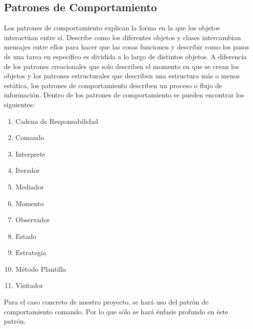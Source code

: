 \subsection{Patrones de Comportamiento}
Los patrones de comportamiento explican la forma en la que los objetos interactúan entre sí. Describe como los diferentes objetos y clases intercambian mensajes entre ellos para hacer que las cosas funcionen y describir como los pasos de una tarea en específico es dividida a lo largo de distintos objetos. A diferencia de los patrones creacionales que solo describen el momento en que se crean los objetos y los patrones estructurales que describen una estructura más o menos estática, los patrones de comportamiento describen un proceso o flujo de información\cite{behavioral}.
Dentro de los patrones de comportamiento se pueden encontrar los siguientes:
\begin{enumerate}
\item Cadena de Responsabilidad
\item Comando
\item Interprete
\item Iterador
\item Mediador
\item Momento
\item Observador
\item Estado
\item Estrategia
\item Método Plantilla
\item Visitador
\end{enumerate}

Para el caso concreto de nuestro proyecto, se hará uso del patrón de comportamiento comando. Por lo que sólo se hará énfasis profundo en éste patrón.
